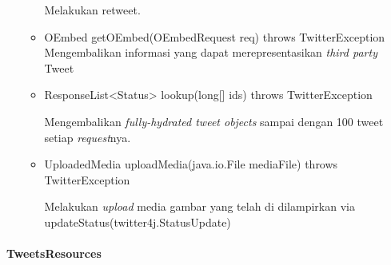 \begin{itemize}
\begin{itemize}
			Melakukan retweet.
			\item OEmbed getOEmbed(OEmbedRequest req) throws TwitterException
			Mengembalikan informasi yang dapat merepresentasikan \textit{third party} Tweet
			
			\item ResponseList<Status> lookup(long[] ids) throws TwitterException
			
			Mengembalikan \textit{fully-hydrated tweet objects} sampai dengan 100 tweet setiap \textit{request}nya.
			\item UploadedMedia uploadMedia(java.io.File mediaFile) throws TwitterException
			
			Melakukan \textit{upload} media gambar yang telah di dilampirkan via updateStatus(twitter4j.StatusUpdate)
		\end{itemize}
	\end{itemize}

	\paragraph{TweetsResources}
	
